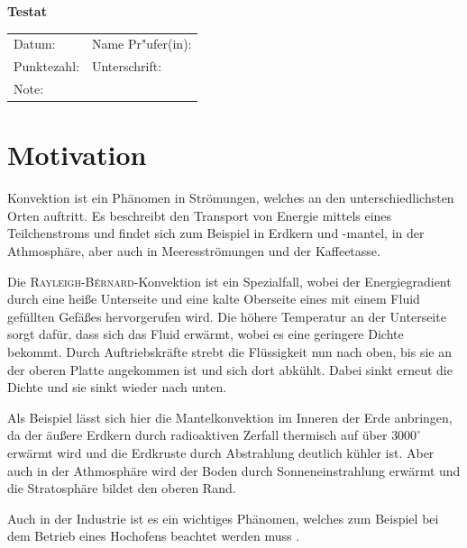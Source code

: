 \documentclass[12pt,a4paper,titlepage,headinclude]{scrartcl}
\numberwithin{equation}{subsection}
\begin{document}
\begin{titlepage}
\begin{center}
\Large{\textbf{Testat}}\\[1.0cm]
\end{center}
\begin{tabular}{p{80mm}l}
Datum:  & Name Pr"ufer(in):\\[0,4cm]
Punktezahl: & Unterschrift: \\[0,4cm]
Note:& 
\end{tabular}
\end{titlepage}

\cleardoublepage
\tableofcontents
\thispagestyle{empty}
\cleardoublepage

\setcounter{footnote}{0}
\setcounter{page}{1}


\newpage

\section{Motivation}
\label{sec:einleitung}

Konvektion ist ein Phänomen in Strömungen, welches an den unterschiedlichsten Orten auftritt.
Es beschreibt den Transport von Energie mittels eines Teilchenstroms und findet sich zum Beispiel in Erdkern und -mantel, in der Athmosphäre, aber auch in Meeresströmungen und der Kaffeetasse.

Die \textsc{Rayleigh-Bérnard}-Konvektion ist ein Spezialfall, wobei der Energiegradient durch eine heiße Unterseite und eine kalte Oberseite eines mit einem Fluid gefüllten Gefäßes hervorgerufen wird.
Die höhere Temperatur an der Unterseite sorgt dafür, dass sich das Fluid erwärmt, wobei es eine geringere Dichte bekommt.
Durch Auftriebskräfte strebt die Flüssigkeit nun nach oben, bis sie an der oberen Platte angekommen ist und sich dort abkühlt.
Dabei sinkt erneut die Dichte und sie sinkt wieder nach unten.

Als Beispiel lässt sich hier die Mantelkonvektion im Inneren der Erde anbringen, da der äußere Erdkern durch radioaktiven Zerfall thermisch auf über $3000^\circ$ erwärmt wird und die Erdkruste durch Abstrahlung deutlich kühler ist.
Aber auch in der Athmosphäre wird der Boden durch Sonneneinstrahlung erwärmt und die Stratosphäre bildet den oberen Rand.

Auch in der Industrie ist es ein wichtiges Phänomen, welches zum Beispiel bei dem Betrieb eines Hochofens beachtet werden muss \cite{hochofen}.
\end{document}
